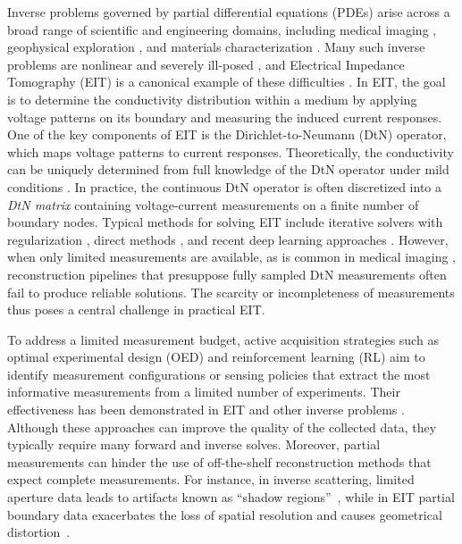 \documentclass{article}
\begin{document}
Inverse problems governed by partial differential equations (PDEs) arise across a broad range of scientific and engineering domains, including medical imaging \citep{arridge1999optical,cheney1990noser,borcea2002electrical}, geophysical exploration \citep{tarantola1982generalized,pratt1999seismic}, and materials characterization \citep{bonnet2005inverse,garcia2011non}. 
Many such inverse problems are nonlinear and severely ill-posed \citep{bal2012introduction, uhlmann2009electrical, isakov2006inverse}, and 
Electrical Impedance Tomography (EIT) is a canonical example of these difficulties \citep{alessandrini1988stable, allers1991stability}. In EIT, the goal is to determine the conductivity distribution within a medium by applying voltage patterns on its boundary and measuring the induced current responses. One of the key components of EIT is the Dirichlet-to-Neumann (DtN) operator, which maps voltage patterns to current responses. Theoretically, the conductivity can be uniquely determined from full knowledge of the DtN operator under mild conditions \citep{nachman1996global, astala2006calderon,uhlmann2013inverse, sylvester1987global}. 
In practice, the continuous DtN operator is often discretized into a \emph{DtN matrix} containing voltage-current measurements on a finite number of boundary nodes. 
Typical methods for solving EIT include iterative solvers with regularization \citep{hanke1997regularizing, haber2000optimization,jin2012reconstruction, vauhkonen2002tikhonov}, direct methods \citep{chow2021direct,chow2014direct, mueller2020d}, and recent deep learning approaches \citep{hamilton2018deep, ong2022integral, guo2023transformer, cen2023electrical, chen2024pseudo, molinaro2023neural, bhat2025neural}. However, when only limited measurements are available, as is common in medical imaging \citep{heines2023clinical, putensen2019electrical, scaramuzzo2024electrical}, reconstruction pipelines that presuppose fully sampled DtN measurements often fail to produce reliable solutions. The scarcity or incompleteness of measurements thus poses a central challenge in practical EIT.

To address a limited measurement budget, active acquisition strategies such as optimal experimental design (OED) and reinforcement learning (RL) aim to identify measurement configurations or sensing policies that extract the most informative measurements from a limited number of experiments. Their effectiveness has been demonstrated in EIT \citep{hyvonen2024bayesian,jin2024continuous} and other inverse problems \citep{huan2013simulation,shen2022learning,alexanderian2021optimal,jiang2024reinforced,go2025accurate,koval2025non}. 
Although these approaches can improve the quality of the collected data, they typically require many forward and inverse solves. Moreover, partial measurements can hinder the use of off-the-shelf reconstruction methods that expect complete measurements. For instance, in inverse scattering, limited aperture data leads to artifacts known as ``shadow regions''~\citep{colton2006target, li2015recovering}, while in EIT partial boundary data exacerbates the loss of spatial resolution and causes geometrical distortion~\citep{hauptmann2017approximation, alsaker2017direct}.
\end{document}
